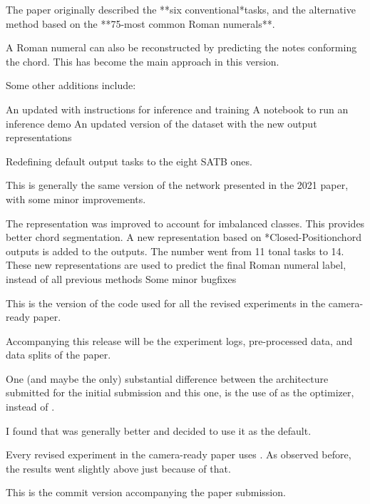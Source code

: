 
The paper originally described the **six conventional*tasks,
and the alternative method based on the **75-most common
Roman numerals**.

A Roman numeral can also be reconstructed by predicting the
notes conforming the chord. This has become the main
approach in this version.

Some other additions include:

An updated  with instructions for inference and
training A notebook to run an inference demo An updated
version of the dataset with the new output representations

Redefining default output tasks to the eight SATB ones.

This is generally the same version of the
 network presented in the 2021 paper,
with some minor improvements.

The  representation was improved to
account for imbalanced classes. This provides better chord
segmentation. A new representation based on
*Closed-Positionchord outputs is added to the outputs. The
number went from 11 tonal tasks to 14. These new
representations are used to predict the final Roman numeral
label, instead of all previous methods Some minor bugfixes

This is the version of the code used for all the revised
experiments in the camera-ready paper.

Accompanying this release will be the experiment logs,
pre-processed data, and data splits of the paper.

One (and maybe the only) substantial difference between the
architecture submitted for the initial submission and this
one, is the use of  as the optimizer, instead
of .

I found that  was generally better and decided
to use it as the default.

Every revised experiment in the camera-ready paper uses
. As observed before, the results went
slightly above just because of that.

This is the commit version accompanying the paper
submission.

